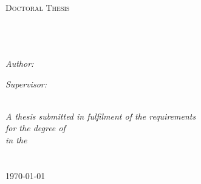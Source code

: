 \documentclass[11pt, a4paper, oneside]{Thesis} %
\begin{document}
\begin{titlepage}
\begin{center}

\textsc{\LARGE \univname}\\[1.5cm] %
\textsc{\Large Doctoral Thesis}\\[0.5cm] %

\HRule \\[0.4cm] %
{\huge \bfseries \ttitle}\\[0.4cm] %
\HRule \\[1.5cm] %
 
\begin{minipage}{0.4\textwidth}
\begin{flushleft} \large
\emph{Author:}\\
\href{http://www.johnsmith.com}{\authornames} %
\end{flushleft}
\end{minipage}
\begin{minipage}{0.4\textwidth}
\begin{flushright} \large
\emph{Supervisor:} \\
\href{http://www.jamessmith.com}{\supname} %
\end{flushright}
\end{minipage}\\[3cm]
 
\large \textit{A thesis submitted in fulfilment of the requirements\\ for the degree of \degreename}\\[0.3cm] %
\textit{in the}\\[0.4cm]
\groupname\\\deptname\\[2cm] %
 
{\large \today}\\[4cm] %
 
\vfill
\end{center}

\end{titlepage}

\end{document}
